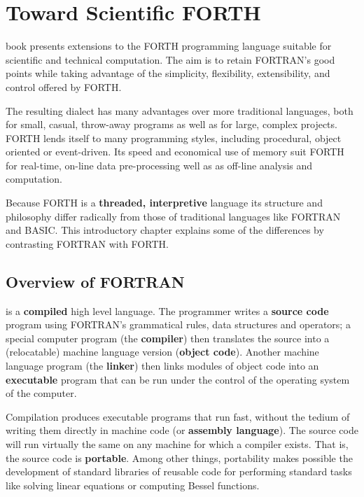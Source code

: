 
\chapter{Toward Scientific FORTH}

 book presents extensions to the FORTH programming language suitable for scientific and technical computation. The aim is to retain FORTRAN's good points while taking advantage of the simplicity, flexibility, extensibility, and control offered by FORTH.

The resulting dialect has many advantages over more traditional languages, both for small, casual, throw-away programs as well as for large, complex projects. FORTH lends itself to many programming styles, including procedural, object oriented or event-driven. Its speed and economical use of memory suit FORTH for real-time, on-line data pre-processing well as as off-line analysis and computation.

Because FORTH is a \textbf{threaded, interpretive} language its  structure and philosophy differ radically from those of traditional languages like FORTRAN and BASIC. This introductory chapter explains some of the differences by contrasting FORTRAN with FORTH.

\section{Overview of FORTRAN} 
 is a \textbf{compiled} high level language. The programmer writes a \textbf{source code} program using FORTRAN's grammatical rules, data structures and operators; a special computer program (the \textbf{compiler}) then translates the source into a (relocatable) machine language version (\textbf{object code}). Another machine language program (the \textbf{linker}) then links modules of object code into an \textbf{executable} program that can be run under the control of the operating system of the computer.

Compilation produces executable programs that run fast, without the tedium of writing them directly in machine code (or \textbf{assembly language}). The source code will run virtually the same on any machine for which a compiler exists. That is, the source code is \textbf{portable}. Among other things, portability makes possible the development of standard libraries of reusable code for performing standard tasks like solving linear equations or computing Bessel functions.

